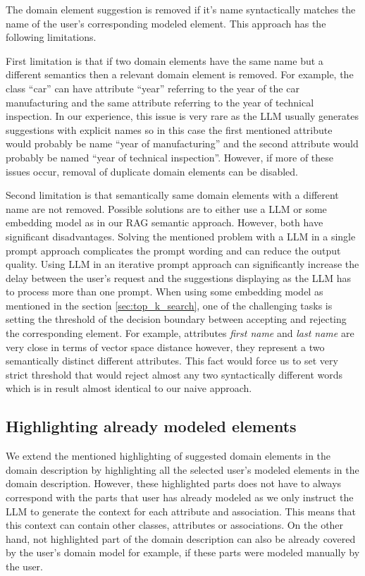 The domain element suggestion is removed if it's name syntactically matches the name of the user's corresponding modeled element. This approach has the following limitations.

First limitation is that if two domain elements have the same name but a different semantics then a relevant domain element is removed. For example, the class ``car'' can have attribute ``year'' referring to the year of the car manufacturing and the same attribute referring to the year of technical inspection. In our experience, this issue is very rare as the LLM usually generates suggestions with explicit names so in this case the first mentioned attribute would probably be name ``year of manufacturing'' and the second attribute would probably be named ``year of technical inspection''. However, if more of these issues occur, removal of duplicate domain elements can be disabled.

Second limitation is that semantically same domain elements with a different name are not removed. Possible solutions are to either use a LLM or some embedding model as in our RAG semantic approach. However, both have significant disadvantages. Solving the mentioned problem with a LLM in a single prompt approach complicates the prompt wording and can reduce the output quality. Using LLM in an iterative prompt approach can significantly increase the delay between the user's request and the suggestions displaying as the LLM has to process more than one prompt. When using some embedding model as mentioned in the section \ref{sec:top_k_search}, one of the challenging tasks is setting the threshold of the decision boundary  between accepting and rejecting the corresponding element. For example, attributes \textit{first name} and \textit{last name} are very close in terms of vector space distance however, they represent a two semantically distinct different attributes. This fact would force us to set very strict threshold that would reject almost any two syntactically different words which is in result almost identical to our naive approach.


\subsection{Highlighting already modeled elements}

We extend the mentioned highlighting of suggested domain elements in the domain description by highlighting all the selected user's modeled elements in the domain description. However, these highlighted parts does not have to always correspond with the parts that user has already modeled as we only instruct the LLM to generate the context for each attribute and association. This means that this context can contain other classes, attributes or associations. On the other hand, not highlighted part of the domain description can also be already covered by the user's domain model for example, if these parts were modeled manually by the user.


